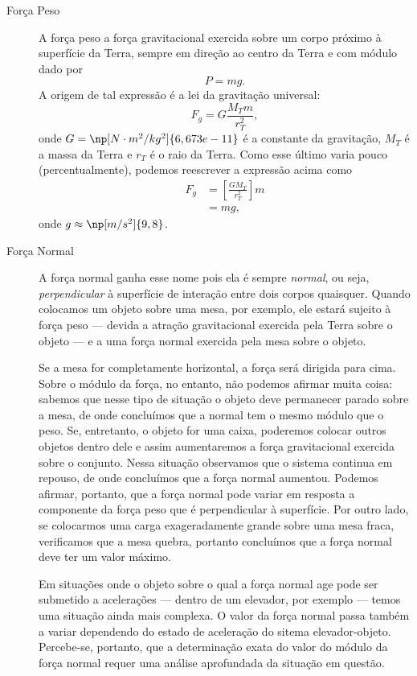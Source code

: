 \begin{description}
	\item[Força Peso] A força peso a força gravitacional exercida sobre um corpo próximo à superfície da Terra, sempre em direção ao centro da Terra e com módulo dado por
	\begin{equation}
		P = mg.
	\end{equation}
	A origem de tal expressão é a lei da gravitação universal:
	\begin{equation}
		F_g = G \frac{M_T m}{r_T^2},
	\end{equation}
	onde $G = \np[N\cdot m^2/kg^2]{6,673e-11}$ é a constante da gravitação, $M_T$ é a massa da Terra e $r_T$ é o raio da Terra. Como esse último varia pouco (percentualmente), podemos reescrever a expressão acima como
	\begin{align}
		F_g &= \left[\frac{G M_T}{r_T^2}\right] m \\
			&= mg,
	\end{align}
	onde $g \approx \np[m/s^2]{9,8}$.

\item[Força Normal] A força normal ganha esse nome pois ela é sempre \emph{normal}, ou seja, \emph{perpendicular} à superfície de interação entre dois corpos quaisquer. Quando colocamos um objeto sobre uma mesa, por exemplo, ele estará sujeito à força peso --- devida a atração gravitacional exercida pela Terra sobre o objeto --- e a uma força normal exercida pela mesa sobre o objeto.
	
	Se a mesa for completamente horizontal, a força será dirigida para cima. Sobre o módulo da força, no entanto, não podemos afirmar muita coisa: sabemos que nesse tipo de situação o objeto deve permanecer parado sobre a mesa, de onde concluímos que a normal tem o mesmo módulo que o peso. Se, entretanto, o objeto for uma caixa, poderemos colocar outros objetos dentro dele e assim aumentaremos a força gravitacional exercida sobre o conjunto. Nessa situação observamos que o sistema continua em repouso, de onde concluímos que a força normal aumentou. Podemos afirmar, portanto, que a força normal pode variar em resposta a componente da força peso que é perpendicular à superfície. Por outro lado, se colocarmos uma carga exageradamente grande sobre uma mesa fraca, verificamos que a mesa quebra, portanto concluímos que a força normal deve ter um valor máximo.

	Em situações onde o objeto sobre o qual a força normal age pode ser submetido a acelerações --- dentro de um elevador, por exemplo --- temos uma situação ainda mais complexa. O valor da força normal passa também a variar dependendo do estado de aceleração do sitema elevador-objeto. Percebe-se, portanto, que a determinação exata do valor do módulo da força normal requer uma análise aprofundada da situação em questão.


\end{description}
